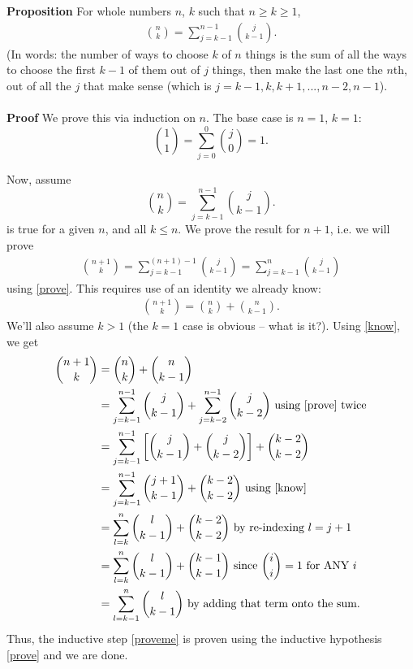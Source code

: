 \documentclass[10pt]{article}
\newcommand{\prop}{\noindent \textbf{Proposition} }
\newcommand{\pf}{\noindent \textbf{Proof} }
\begin{document}


\prop For whole numbers $n$, $k$ such that $n \geq k \geq 1$, 
\begin{align} 
{n \choose k} = \sum_{j=k-1}^{n-1} {j \choose k-1}.  \label{prove}
\end{align}
(In words: the number of ways to choose $k$ of $n$ things is the sum of all the ways to choose the first $k-1$ of them out of $j$ things, then make the last one the $n$th, out of all the $j$ that make sense (which is $j = k-1, k, k+1, ..., n-2, n-1$). 
\\\\
\pf We prove this via induction on $n$. The base case is $n=1$, $k=1$: 
\[ {1 \choose 1} = \sum_{j=0}^{0} {j \choose 0} = 1. \]

Now, assume 
\[ {n \choose k} = \sum_{j=k-1}^{n-1} {j \choose k-1}. \]
is true for a given $n$, and all $k \leq n$. We prove the result for $n+1$, i.e. we will prove 
\begin{align} 
{n+1 \choose k} = \sum_{j=k-1}^{(n+1)-1} {j \choose k-1} = \sum_{j=k-1}^{n} {j \choose k-1} \label{proveme}
\end{align}
using \eqref{prove}. This requires use of an identity we already know: 
\begin{align} 
{n+1 \choose k} = {n \choose k} + {n \choose k-1}. \label{know}
\end{align}
We'll also assume $k > 1$ (the $k=1$ case is obvious -- what is it?). Using \eqref{know}, we get 
\begin{align*}
{n+1 \choose k} & = {n \choose k} + {n \choose k-1} \\
 & = \sum_{j=k-1}^{n-1} {j \choose k-1} + \sum_{j=k-2}^{n-1} {j \choose k-2} \text{ using \eqref{prove} twice} \\
 & = \sum_{j=k-1}^{n-1} \left[ {j \choose k-1} + {j \choose k-2}\right] + {k-2 \choose k-2} \\
 & = \sum_{j=k-1}^{n-1} {j+1 \choose k-1} + {k-2 \choose k-2} \text{ using \eqref{know} } \\
 & = \sum_{l=k}^{n} {l \choose k-1} + {k-2 \choose k-2} \text{ by re-indexing } l = j + 1 \\
 & = \sum_{l=k}^{n} {l \choose k-1} + {k-1 \choose k-1} \text{ since } {i \choose i} = 1 \text{ for ANY } i \\
 & = \sum_{l=k-1}^{n} {l \choose k-1} \text{ by adding that term onto the sum. }
\end{align*}
Thus, the inductive step \eqref{proveme} is proven using the inductive hypothesis \eqref{prove} and we are done.
\end{document}
